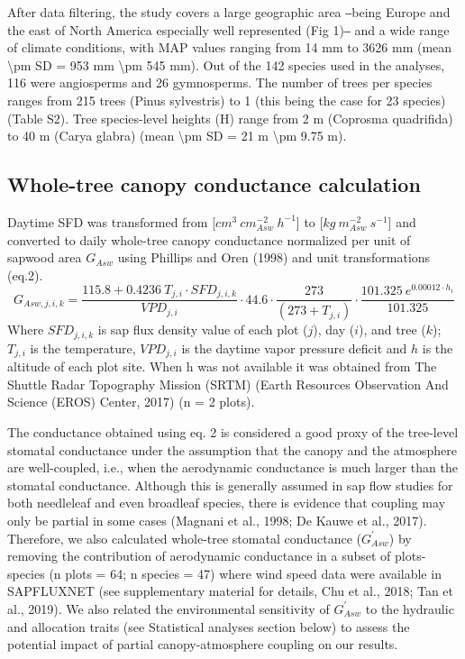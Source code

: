\documentclass[11pt,twoside]{reedthesis}
\begin{document}
After data filtering, the study covers a large geographic area ‒being
Europe and the east of North America especially well represented (Fig
1)‒ and a wide range of climate conditions, with MAP values ranging from
14 mm to 3626 mm (mean \textbackslash{}pm SD = 953 mm \textbackslash{}pm
545 mm). Out of the 142 species used in the analyses, 116 were
angiosperms and 26 gymnosperms. The number of trees per species ranges
from 215 trees (Pinus sylvestris) to 1 (this being the case for 23
species) (Table S2). Tree species-level heights (H) range from 2 m
(Coprosma quadrifida) to 40 m (Carya glabra) (mean \textbackslash{}pm SD
= 21 m \textbackslash{}pm 9.75 m).\par

\subsection{Whole-tree canopy conductance
calculation}\label{whole-tree-canopy-conductance-calculation}

Daytime SFD was transformed from
{[}\(cm^3 \: cm_{Asw}^{-2} \: h^{-1}\){]} to
{[}\(kg \: m_{Asw}^{-2} \: s^{-1}\){]} and converted to daily whole-tree
canopy conductance normalized per unit of sapwood area \(G_{Asw}\) using
Phillips and Oren (1998) and unit transformations (eq.2).
\begin{equation}
G_{Asw,j,i,k} = \frac{115.8 + 0.4236 \: T_{j , i} \cdot SFD_{j , i , k}}{VPD_{j,i}}\cdot 44.6 \cdot \frac{273}{(273 + T_{j,i})} \cdot \frac{101.325 \: e^{0.00012 \cdot h_i}}{101.325}
\end{equation}
Where \(SFD_{j,i,k}\) is sap flux density value of each plot (\(j\)),
day (\(i\)), and tree (\(k\)); \(T_{j,i}\) is the temperature,
\(VPD_{j,i}\) is the daytime vapor pressure deficit and \(h\) is the
altitude of each plot site. When h was not available it was obtained
from The Shuttle Radar Topography Mission (SRTM) (Earth Resources
Observation And Science (EROS) Center, 2017) (n = 2 plots).\par

The conductance obtained using eq. 2 is considered a good proxy of the
tree-level stomatal conductance under the assumption that the canopy and
the atmosphere are well-coupled, i.e., when the aerodynamic conductance
is much larger than the stomatal conductance. Although this is generally
assumed in sap flow studies for both needleleaf and even broadleaf
species, there is evidence that coupling may only be partial in some
cases (Magnani et al., 1998; De Kauwe et al., 2017). Therefore, we also
calculated whole-tree stomatal conductance (\(G_{Asw}^{'}\)) by removing
the contribution of aerodynamic conductance in a subset of plots-species
(n plots = 64; n species = 47) where wind speed data were available in
SAPFLUXNET (see supplementary material for details, Chu et al., 2018;
Tan et al., 2019). We also related the environmental sensitivity of
\(G_{Asw}^{'}\) to the hydraulic and allocation traits (see Statistical
analyses section below) to assess the potential impact of partial
canopy-atmosphere coupling on our results.\par
\end{document}
